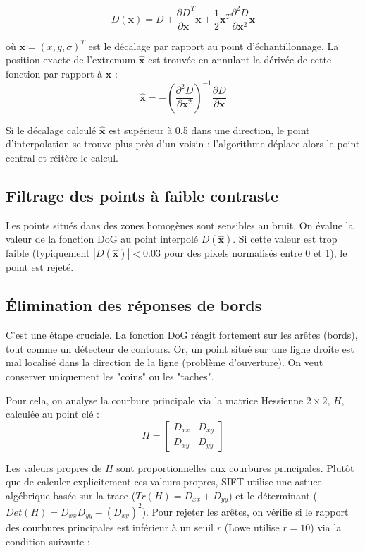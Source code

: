 \documentclass[a4paper,12pt]{report}
\begin{document}
\begin{equation}
    D(\mathbf{x}) = D + \frac{\partial D}{\partial \mathbf{x}}^T\mathbf{x} + \frac{1}{2}\mathbf{x}^T \frac{\partial^2 D}{\partial \mathbf{x}^2}\mathbf{x}
\end{equation}

où $\mathbf{x} = (x, y, \sigma)^T$ est le décalage par rapport au point d'échantillonnage. La position exacte de l'extremum $\hat{\mathbf{x}}$ est trouvée en annulant la dérivée de cette fonction par rapport à $\mathbf{x}$ :
\begin{equation}
    \hat{\mathbf{x}} = - \left( \frac{\partial^2 D}{\partial \mathbf{x}^2} \right)^{-1} \frac{\partial D}{\partial \mathbf{x}}
\end{equation}

Si le décalage calculé $\hat{\mathbf{x}}$ est supérieur à 0.5 dans une direction, le point d'interpolation se trouve plus près d'un voisin : l'algorithme déplace alors le point central et réitère le calcul.

\subsection{Filtrage des points à faible contraste}
Les points situés dans des zones homogènes sont sensibles au bruit. On évalue la valeur de la fonction DoG au point interpolé $D(\hat{\mathbf{x}})$. Si cette valeur est trop faible (typiquement $|D(\hat{\mathbf{x}})| < 0.03$ pour des pixels normalisés entre 0 et 1), le point est rejeté.

\subsection{Élimination des réponses de bords}
C'est une étape cruciale. La fonction DoG réagit fortement sur les arêtes (bords), tout comme un détecteur de contours. Or, un point situé sur une ligne droite est mal localisé dans la direction de la ligne (problème d'ouverture). On veut conserver uniquement les "coins" ou les "taches".

Pour cela, on analyse la courbure principale via la matrice Hessienne $2\times2$, $H$, calculée au point clé :
\begin{equation}
    H = \begin{bmatrix} D_{xx} & D_{xy} \\ D_{xy} & D_{yy} \end{bmatrix}
\end{equation}

Les valeurs propres de $H$ sont proportionnelles aux courbures principales. Plutôt que de calculer explicitement ces valeurs propres, SIFT utilise une astuce algébrique basée sur la trace ($Tr(H) = D_{xx} + D_{yy}$) et le déterminant ($Det(H) = D_{xx}D_{yy} - (D_{xy})^2$).
Pour rejeter les arêtes, on vérifie si le rapport des courbures principales est inférieur à un seuil $r$ (Lowe utilise $r=10$) via la condition suivante :
\end{document}
